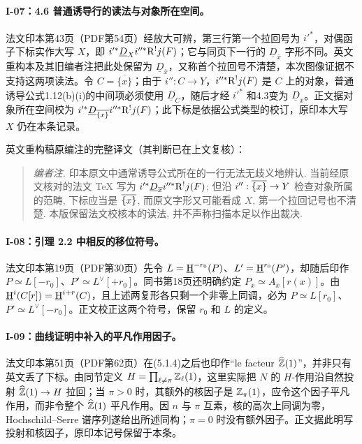 \hypertarget{collation-I-07}{}

\paragraph*{I-07：4.6 普通诱导行的读法与对象所在空间。}法文印本第43页（PDF第54页）经放大可辨，第三行第一个拉回号为 $i'^*$，对偶函子下标实作大写 $X$，即 $i'^*\underline D_Xi''^*\mathrm R^!j(F)$；它与同页下一行的 $\underline D_{\bar x}$ 字形不同。英文重构本及其旧编者注把此处保留为 $\underline D_{\bar x}$，又称首个拉回号不清楚，本次图像证据不支持这两项读法。令 $C=\overline{\{x\}}$；由于 $i'':C\to Y$，$i''^*\mathrm R^!j(F)$ 是 $C$ 上的对象，普通诱导公式1.12(b)(i)的中间项必须使用 $\underline D_C$，随后才经 $i'^*$ 和4.3变为 $\underline D_{\bar x}$。正文据对象所在空间校为 $i'^*\underline D_{\overline{\{x\}}}i''^*\mathrm R^!j(F)$；此下标是依据公式类型的校订，原印本大写 $X$ 仍在本条记录。

英文重构稿原编注的完整译文（其判断已在上文复核）：
\begin{quote}\small
\emph{编者注.} 印本原文中通常诱导公式所在的一行无法无歧义地辨认. 当前经原文核对的法文 TeX 写为 $i'^*\underline D_{\overline{x}}i''^*\mathrm R^!j(F)$; 但沿 $i'':\overline{\{x\}}\to Y$ 检查对象所属的范畴, 下标应当是 $\overline{\{x\}}$, 而原文字形又可能看成 $X$, 第一个拉回记号也不清楚. 本版保留法文校核本的读法, 并不声称扫描本足以作出裁决.
\end{quote}

\hypertarget{collation-I-08}{}

\paragraph*{I-08：引理 2.2 中相反的移位符号。}法文印本第19页（PDF第30页）先令 $L=\underline{\mathrm H}^{-r_0}(P)$、$L'=\underline{\mathrm H}^{r_0}(P')$，却随后印作 $P\simeq L[-r_0]$、$P'\simeq L^\vee[+r_0]$。同书第18页还明确约定 $P_{\bar x}\simeq A_{\bar x}[r(x)]$。由 $\underline{\mathrm H}^i(C[r])=\underline{\mathrm H}^{i+r}(C)$，且上述两复形各只剩一个非零上同调，必为 $P\simeq L[r_0]$、$P'\simeq L^\vee[-r_0]$。正文校正这两个符号，保留 $r_0$ 和 $L$ 的定义。

\hypertarget{collation-I-09}{}

\paragraph*{I-09：曲线证明中补入的平凡作用因子。}法文印本第51页（PDF第62页）在(5.1.4)之后也印作“le facteur $\widehat{\mathbb Z}(1)$”，并非只有英文丢了下标。由同节定义 $H=\prod_{\ell\ne\pi}\mathbb Z_\ell(1)$，这里实际把 $N$ 的 $H$-作用沿自然投射 $\widehat{\mathbb Z}(1)\to H$ 拉回；当 $\pi>0$ 时，其额外的核因子是 $\mathbb Z_\pi(1)$，应令这个因子平凡作用，而非令整个 $\widehat{\mathbb Z}(1)$ 平凡作用。因 $n$ 与 $\pi$ 互素，核的高次上同调为零，Hochschild--Serre 谱序列遂给出所述同构；$\pi=0$ 时没有额外因子。正文据此明写投射和核因子，原印本记号保留于本条。


